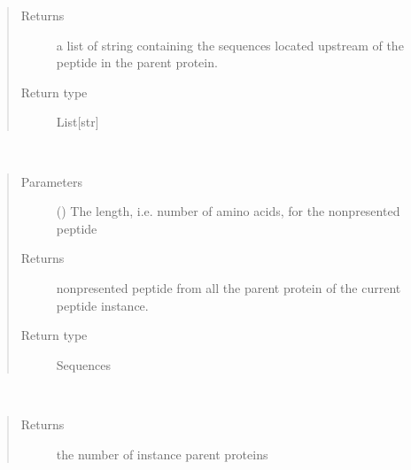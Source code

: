 \documentclass[letterpaper,10pt,english]{sphinxmanual}
\begin{document}
\begin{fulllineitems}
\begin{fulllineitems}
\begin{quote}
\begin{description}
\item[{Returns}] \leavevmode
a list of string containing the sequences located upstream of the peptide in the parent protein.

\item[{Return type}] \leavevmode
List{[}str{]}

\end{description}\end{quote}

\end{fulllineitems}


\begin{fulllineitems}
\label{\detokenize{IPTK.Classes:IPTK.Classes.Peptide.Peptide.get_non_presented_peptides}}~\begin{quote}\begin{description}
\item[{Parameters}] \leavevmode
{} () \textendash{} The length, i.e. number of amino acids, for the non\sphinxhyphen{}presented peptide

\item[{Returns}] \leavevmode
non\sphinxhyphen{}presented peptide from all the parent protein of the current peptide instance.

\item[{Return type}] \leavevmode
Sequences

\end{description}\end{quote}

\end{fulllineitems}


\begin{fulllineitems}
\label{\detokenize{IPTK.Classes:IPTK.Classes.Peptide.Peptide.get_number_of_parents}}~\begin{quote}\begin{description}
\item[{Returns}] \leavevmode
the number of instance parent proteins


\end{description}
\end{quote}
\end{fulllineitems}
\end{fulllineitems}
\end{document}
